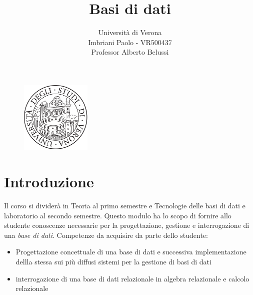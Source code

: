\documentclass[a4paper]{article}
\title{Basi di dati}
\author{Università di Verona\\Imbriani Paolo - VR500437\\Professor Alberto Belussi}
\begin{document}
\begin{figure}
    \centering
    \includegraphics[width=0.3\textwidth]{../UniversityofVerona.png}
    \label{fig:centered-image}
\end{figure}

\maketitle

\pagebreak

\tableofcontents

\pagebreak

\section{Introduzione}


Il corso si dividerà in Teoria al primo semestre e 
Tecnologie delle basi di dati e laboratorio al secondo semestre.
Questo modulo ha lo scopo di fornire allo studente conoscenze necessarie per la progettazione,
gestione e interrogazione di una \textit{base di dati}.
Competenze da acquisire da parte dello studente:
\begin{itemize}
    \item Progettazione concettuale di una base di dati e successiva implementazione dellla stessa sui più diffusi
    sistemi per la gestione di basi di dati
    \item interrogazione di una base di dati relazionale in algebra relazionale e calcolo relazionale
\end{itemize}
\end{document}
